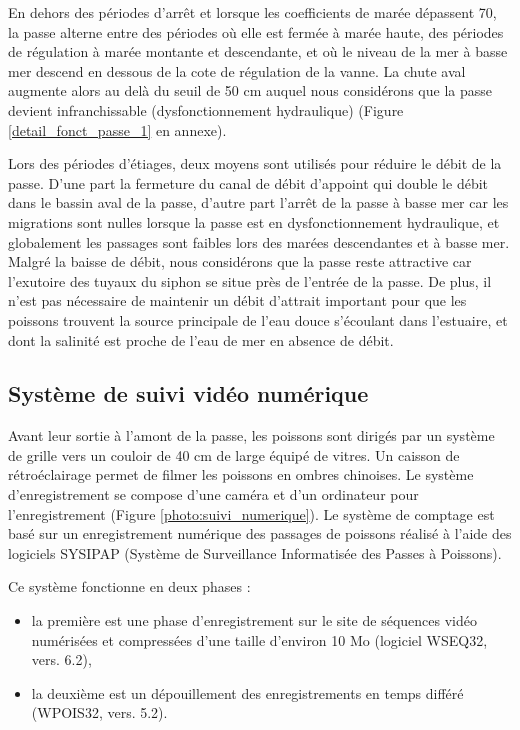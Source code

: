 \documentclass[11pt,twocolumn,titlepage,twoside]{article}\usepackage[]{graphicx}\usepackage[]{xcolor}
\begin{document}
En dehors des périodes d'arrêt et lorsque les coefficients de marée dépassent
70, la passe alterne entre des périodes où elle est fermée à marée haute, des
périodes de régulation à marée montante et descendante, et où le niveau de la
mer à basse mer descend en dessous de la cote de régulation de la vanne. La
chute aval augmente alors au delà du seuil de 50 cm auquel nous
considérons que la passe devient infranchissable (dysfonctionnement hydraulique)
(Figure \ref{detail_fonct_passe_1} en annexe).


Lors des périodes d'étiages, deux moyens sont utilisés pour réduire le débit de
la passe. D'une part la fermeture du canal de débit d'appoint qui double
le débit dans le bassin aval de la passe, d'autre part l'arrêt de la passe
à basse mer car les migrations sont nulles lorsque la passe est en
dysfonctionnement hydraulique, et globalement les passages sont faibles
lors des marées descendantes et à basse mer. Malgré la baisse de débit, nous
considérons que la passe reste attractive car l'exutoire des tuyaux du siphon
se situe près de l'entrée de la passe. De plus, il n'est pas nécessaire de
maintenir un débit d'attrait important pour que les poissons trouvent la source
principale de l'eau douce s'écoulant dans l'estuaire, et dont la salinité est
proche de l'eau de mer en absence de débit.



\subsection{Système de suivi vidéo numérique}

Avant leur sortie à l'amont de la passe, les poissons sont dirigés par un
système de grille vers un couloir de 40 cm de large équipé de vitres. Un caisson
de rétroéclairage permet de filmer les poissons en ombres chinoises. Le système
d'enregistrement se compose d'une caméra et d'un ordinateur pour
l'enregistrement (Figure \ref{photo:suivi_numerique}). Le système de comptage
est basé sur un enregistrement numérique des passages de poissons réalisé à
l’aide des logiciels SYSIPAP (Système de Surveillance Informatisée des Passes
à Poissons).


Ce système fonctionne en deux phases :

\begin{itemize}
\item la première est une phase d'enregistrement sur le site de séquences vidéo
numérisées et compressées d’une taille d’environ 10 Mo (logiciel WSEQ32, vers. 6.2),
\item la deuxième est un dépouillement des enregistrements en temps différé
(WPOIS32, vers. 5.2).
\end{itemize}
\end{document}
